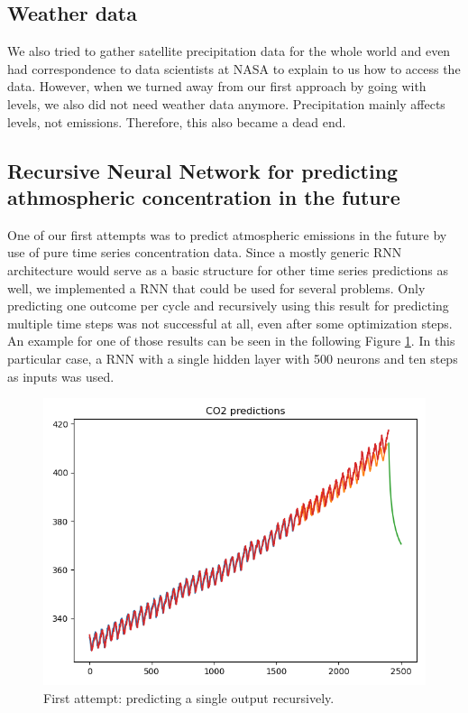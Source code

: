 \subsection{Weather data}

We also tried to gather satellite precipitation data for the whole world and even had correspondence to data scientists at NASA to explain to us how to access the data. However, when we turned away from our first approach by going with \co levels, we also did not need weather data anymore. Precipitation mainly affects \co levels, not \co emissions. Therefore, this also became a dead end.

\subsection{Recursive Neural Network for predicting athmospheric \co concentration in the future}

One of our first attempts was to predict atmospheric \co emissions in the future by use of pure time series \co concentration data.  Since a mostly generic RNN architecture would serve as a basic structure for other time series predictions as well, we implemented a RNN that could be used for several problems. Only predicting one outcome per cycle and recursively using this result for predicting multiple time steps was not successful at all, even after some optimization steps. An example for one of those results can be seen in the following Figure \ref{fig:RNN1}. In this particular case, a RNN with a single hidden layer with 500 neurons and ten steps as inputs was used.

\begin{figure}[hb!]
	\centering
	\includegraphics[width=0.7\linewidth]{./RNN_athmospheric _CO2_prediction/500neurons_10_inputs_1_output.jpg}
	\caption{\co First attempt: predicting a single output recursively.}
	\label{fig:RNN1}
\end{figure}

